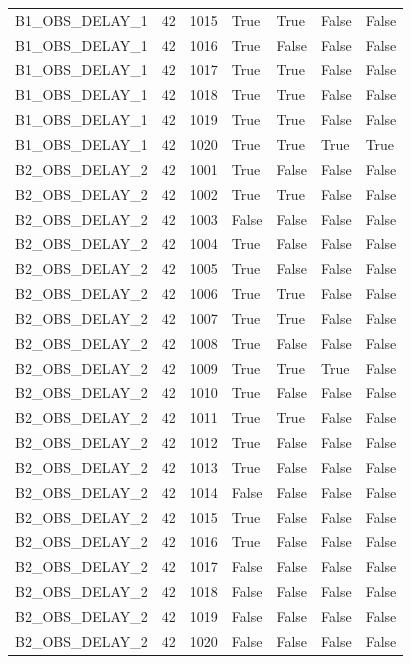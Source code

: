\documentclass[11pt,a4paper,oneside]{book}
\begin{document}
\begin{longtable}{l l l l l l l}
B1\_OBS\_DELAY\_1 & 42 & 1015 & True & True & False & False \\
B1\_OBS\_DELAY\_1 & 42 & 1016 & True & False & False & False \\
B1\_OBS\_DELAY\_1 & 42 & 1017 & True & True & False & False \\
B1\_OBS\_DELAY\_1 & 42 & 1018 & True & True & False & False \\
B1\_OBS\_DELAY\_1 & 42 & 1019 & True & True & False & False \\
B1\_OBS\_DELAY\_1 & 42 & 1020 & True & True & True & True \\
B2\_OBS\_DELAY\_2 & 42 & 1001 & True & False & False & False \\
B2\_OBS\_DELAY\_2 & 42 & 1002 & True & True & False & False \\
B2\_OBS\_DELAY\_2 & 42 & 1003 & False & False & False & False \\
B2\_OBS\_DELAY\_2 & 42 & 1004 & True & False & False & False \\
B2\_OBS\_DELAY\_2 & 42 & 1005 & True & False & False & False \\
B2\_OBS\_DELAY\_2 & 42 & 1006 & True & True & False & False \\
B2\_OBS\_DELAY\_2 & 42 & 1007 & True & True & False & False \\
B2\_OBS\_DELAY\_2 & 42 & 1008 & True & False & False & False \\
B2\_OBS\_DELAY\_2 & 42 & 1009 & True & True & True & False \\
B2\_OBS\_DELAY\_2 & 42 & 1010 & True & False & False & False \\
B2\_OBS\_DELAY\_2 & 42 & 1011 & True & True & False & False \\
B2\_OBS\_DELAY\_2 & 42 & 1012 & True & False & False & False \\
B2\_OBS\_DELAY\_2 & 42 & 1013 & True & False & False & False \\
B2\_OBS\_DELAY\_2 & 42 & 1014 & False & False & False & False \\
B2\_OBS\_DELAY\_2 & 42 & 1015 & True & False & False & False \\
B2\_OBS\_DELAY\_2 & 42 & 1016 & True & False & False & False \\
B2\_OBS\_DELAY\_2 & 42 & 1017 & False & False & False & False \\
B2\_OBS\_DELAY\_2 & 42 & 1018 & False & False & False & False \\
B2\_OBS\_DELAY\_2 & 42 & 1019 & False & False & False & False \\
B2\_OBS\_DELAY\_2 & 42 & 1020 & False & False & False & False \\

\end{longtable}
\end{document}
